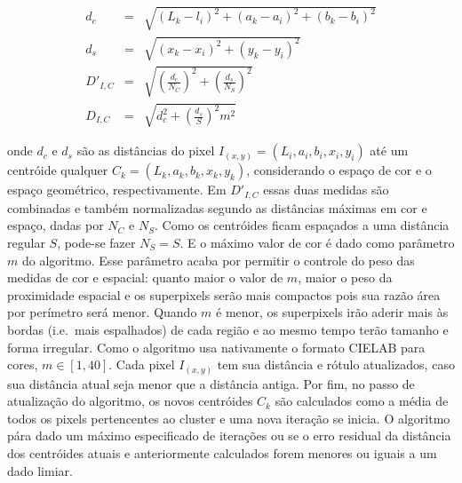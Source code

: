 \begin{eqnarray}
  d_c      & = & \sqrt{(L_k - l_i)^2 + (a_k - a_i)^2 + (b_k - b_i)^2} \\
  d_s      & = & \sqrt{(x_k - x_i)^2 + (y_k - y_i)^2} \\
  D'_{I,C}  & = & \sqrt{(\frac{d_c}{N_C})^2 + (\frac{d_s}{N_S})^2} \\
  D_{I,C}   & = & \sqrt{d_c^2 + (\frac{d_s}{S})^2 m^2}
\end{eqnarray}

\noindent onde $d_c$ e $d_s$ são as distâncias do pixel $I_{(x,y)} =
(L_i, a_i, b_i, x_i, y_i)$ até um centróide qualquer $C_k = (L_k, a_k,
b_k, x_k, y_k)$, considerando o espaço de cor e o espaço geométrico,
respectivamente. Em $D'_{I,C}$ essas duas medidas são combinadas e
também normalizadas segundo as distâncias máximas em cor e espaço,
dadas por $N_C$ e $N_S$. Como os centróides ficam espaçados a uma
distância regular $S$, pode-se fazer $N_S = S$. E o máximo valor de
cor é dado como parâmetro $m$ do algoritmo. Esse parâmetro acaba por
permitir o controle do peso das medidas de cor e espacial: quanto
maior o valor de $m$, maior o peso da proximidade espacial e os
superpixels serão mais compactos pois sua razão área por perímetro
será menor. Quando $m$ é menor, os superpixels irão aderir mais às
bordas (i.e.\ mais espalhados) de cada região e ao mesmo tempo terão
tamanho e forma irregular. Como o algoritmo usa nativamente o formato
CIELAB para cores, $m \in [1, 40]$. Cada pixel $I_{(x,y)}$ tem sua
distância e rótulo atualizados, caso sua distância atual seja menor
que a distância antiga. Por fim, no passo de atualização do algoritmo,
os novos centróides $C_k$ são calculados como a média de todos os
pixels pertencentes ao cluster e uma nova iteração se inicia. O
algoritmo pára dado um máximo especificado de iterações ou se o erro
residual da distância dos centróides atuais e anteriormente calculados
forem menores ou iguais a um dado limiar.

